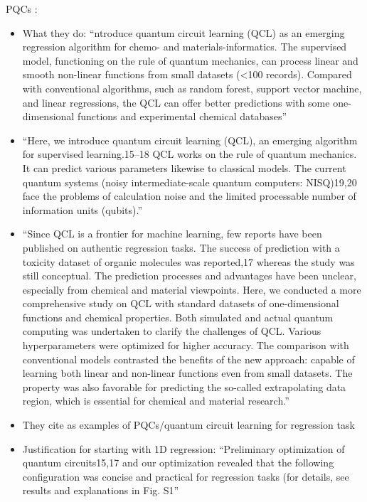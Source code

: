 \documentclass[journal=jacsat,manuscript=article]{achemso}
\begin{document}
PQCs \cite{hatakeyama-sato_quantum_2023}:
\begin{itemize}
	\item What they do: ``ntroduce quantum circuit learning (QCL) as an emerging regression algorithm for chemo- and materials-informatics. The supervised model, functioning on the rule of quantum mechanics, can process linear and smooth non-linear functions from small datasets (<100 records). Compared with conventional algorithms, such as random forest, support vector machine, and linear regressions, the QCL can offer better predictions with some one-dimensional functions and experimental chemical databases''
	\item ``Here, we introduce quantum circuit learning (QCL), an emerging algorithm for supervised learning.15–18 QCL works on the rule of quantum mechanics. It can predict various parameters likewise to classical models. The current quantum systems (noisy intermediate-scale quantum computers: NISQ)19,20 face the problems of calculation noise and the limited processable number of information units (qubits).''
	\item ``Since QCL is a frontier for machine learning, few reports have been published on authentic regression tasks. The success of prediction with a toxicity dataset of organic molecules was reported,17 whereas the study was still conceptual. The prediction processes and advantages have been unclear, especially from chemical and material viewpoints. Here, we conducted a more comprehensive study on QCL with standard datasets of one-dimensional functions and chemical properties. Both simulated and actual quantum computing was undertaken to clarify the challenges of QCL. Various hyperparameters were optimized for higher accuracy. The comparison with conventional models contrasted the benefits of the new approach: capable of learning both linear and non-linear functions even from small datasets. The property was also favorable for predicting the so-called extrapolating data region, which is essential for chemical and material research.''
	\item They cite \cite{takaki_learning_2021,suzuki_predicting_2020,mitarai_quantum_2018} as examples of PQCs/quantum circuit learning for regression task
	\item Justification for starting with 1D regression: ``Preliminary optimization of quantum circuits15,17 and our optimization revealed that the following configuration was concise and practical for regression tasks (for details, see results and explanations in Fig. S1''
\end{itemize}
\end{document}
